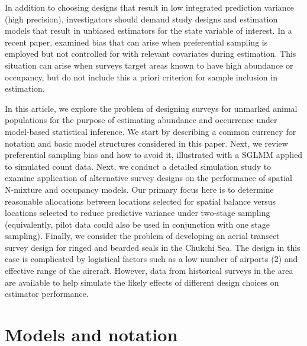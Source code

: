 \documentclass[fleqn,10pt]{wlpeerj}
\begin{document}
In addition to choosing designs that result in low integrated prediction variance (high precision), investigators should demand study designs and estimation models that result in unbiased estimators for the state variable of interest.  In a recent paper, \citet{DiggleEtAl2010} examined bias that can arise when preferential sampling is employed but not controlled for with relevant covariates during estimation.  This situation can arise when surveys target areas known to have high abundance or occupancy, but do not include this a priori criterion for sample inclusion in estimation.  


In this article, we explore the problem of designing surveys for unmarked animal populations for the purpose of estimating abundance and occurrence under model-based statistical inference.  We start by describing a common currency for notation and basic model structures considered in this paper.  Next, we review preferential sampling bias and how to avoid it, illustrated with a SGLMM applied to simulated count data. Next, we conduct a detailed simulation study to examine application of alternative survey designs on the performance of spatial N-mixture and occupancy models.  Our primary focus here is to determine reasonable allocations between locations selected for spatial balance versus locations selected to reduce predictive variance under two-stage sampling (equivalently, pilot data could also be used in conjunction with one stage sampling).  Finally, we consider the problem of developing an aerial transect survey design for ringed and bearded seals in the Chukchi Sea. The design in this case is complicated by logistical factors such as a low number of airports (2) and effective range of the aircraft.  However, data from historical surveys in the area are available to help simulate the likely effects of different design choices on estimator performance.    

\section*{Models and notation}
\end{document}

